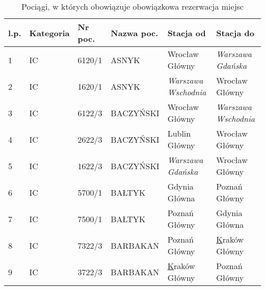 \begin{table}[htbp]
\centering
\begin{tabular}{|llllll|}
\hline
\textbf{l.p.}           & \textbf{Kategoria}      & \textbf{Nr poc.}            & \textbf{Nazwa poc.}            & \textbf{Stacja od}                               & \textbf{Stacja do}          \\ \hline
\multicolumn{1}{|l|}{1} & \multicolumn{1}{l|}{IC} & \multicolumn{1}{l|}{6120/1} & \multicolumn{1}{l|}{ASNYK}     & \multicolumn{1}{l|}{Wrocław Główny}              & \textit{Warszawa Gdańska}   \\ \hline
\multicolumn{1}{|l|}{2} & \multicolumn{1}{l|}{IC} & \multicolumn{1}{l|}{1620/1} & \multicolumn{1}{l|}{ASNYK}     & \multicolumn{1}{l|}{\textit{Warszawa Wschodnia}} & Wrocław Główny              \\ \hline
\multicolumn{1}{|l|}{3} & \multicolumn{1}{l|}{IC} & \multicolumn{1}{l|}{6122/3} & \multicolumn{1}{l|}{BACZYŃSKI} & \multicolumn{1}{l|}{Wrocław Główny}              & \textit{Warszawa Wschodnia} \\ \hline
\multicolumn{1}{|l|}{4} & \multicolumn{1}{l|}{IC} & \multicolumn{1}{l|}{2622/3} & \multicolumn{1}{l|}{BACZYŃSKI} & \multicolumn{1}{l|}{Lublin Główny}               & Wrocław Główny              \\ \hline
\multicolumn{1}{|l|}{5} & \multicolumn{1}{l|}{IC} & \multicolumn{1}{l|}{1622/3} & \multicolumn{1}{l|}{BACZYŃSKI} & \multicolumn{1}{l|}{\textit{Warszawa Gdańska}}   & Wrocław Główny              \\ \hline
\multicolumn{1}{|l|}{6} & \multicolumn{1}{l|}{IC} & \multicolumn{1}{l|}{5700/1} & \multicolumn{1}{l|}{BAŁTYK}    & \multicolumn{1}{l|}{Gdynia Główna}               & Poznań Główny               \\ \hline
\multicolumn{1}{|l|}{7} & \multicolumn{1}{l|}{IC} & \multicolumn{1}{l|}{7500/1} & \multicolumn{1}{l|}{BAŁTYK}    & \multicolumn{1}{l|}{Poznań Główny}               & Gdynia Główna               \\ \hline
\multicolumn{1}{|l|}{8} & \multicolumn{1}{l|}{IC} & \multicolumn{1}{l|}{7322/3} & \multicolumn{1}{l|}{BARBAKAN}  & \multicolumn{1}{l|}{Poznań Główny}               & {\ul Kraków Główny}         \\ \hline
\multicolumn{1}{|l|}{9} & \multicolumn{1}{l|}{IC} & \multicolumn{1}{l|}{3722/3} & \multicolumn{1}{l|}{BARBAKAN}  & \multicolumn{1}{l|}{{\ul Kraków Główny}}         & Poznań Główny               \\ \hline
\end{tabular}
\label{tab:pociagi}
\caption{Pociągi, w których obowiązuje obowiązkowa rezerwacja miejsc}
\end{table}